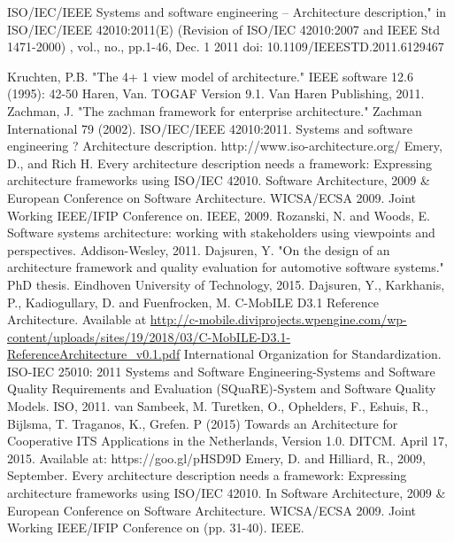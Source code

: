 \documentclass[letterpaper, 10 pt, conference]{ieeeconf}  %
\begin{document}
\begin{thebibliography}{99}


 ISO/IEC/IEEE Systems and software engineering -- Architecture description," in ISO/IEC/IEEE 42010:2011(E) (Revision of ISO/IEC 42010:2007 and IEEE Std 1471-2000) , vol., no., pp.1-46, Dec. 1 2011 doi: 10.1109/IEEESTD.2011.6129467

Kruchten, P.B. "The 4+ 1 view model of architecture." IEEE software 12.6 (1995): 42-50
Haren, Van. TOGAF Version 9.1. Van Haren Publishing, 2011.
Zachman, J. "The zachman framework for enterprise architecture." Zachman International 79 (2002).
 ISO/IEC/IEEE 42010:2011. Systems and software engineering ? Architecture description. http://www.iso-architecture.org/
Emery, D., and Rich H. Every architecture description needs a framework: Expressing architecture frameworks using ISO/IEC 42010. Software Architecture, 2009 \& European Conference on Software Architecture. WICSA/ECSA 2009. Joint Working IEEE/IFIP Conference on. IEEE, 2009.
Rozanski, N. and Woods, E. Software systems architecture: working with stakeholders using viewpoints and perspectives. Addison-Wesley, 2011.
Dajsuren, Y. "On the design of an architecture framework and quality evaluation for automotive software systems." PhD thesis. Eindhoven University of Technology, 2015.
 Dajsuren, Y., Karkhanis, P., Kadiogullary, D. and Fuenfrocken, M. C-MobILE D3.1 Reference Architecture. Available at \url{http://c-mobile.diviprojects.wpengine.com/wp-content/uploads/sites/19/2018/03/C-MobILE-D3.1-ReferenceArchitecture_v0.1.pdf}
International Organization for Standardization. ISO-IEC 25010: 2011 Systems and Software Engineering-Systems and Software Quality Requirements and Evaluation (SQuaRE)-System and Software Quality Models. ISO, 2011.
 van Sambeek, M. Turetken, O., Ophelders, F., Eshuis, R., Bijlsma, T. Traganos, K., Grefen. P (2015) Towards an Architecture for Cooperative ITS Applications in the Netherlands, Version 1.0. DITCM. April 17, 2015. Available at: https://goo.gl/pHSD9D
Emery, D. and Hilliard, R., 2009, September. Every architecture description needs a framework: Expressing architecture frameworks using ISO/IEC 42010. In Software Architecture, 2009 \& European Conference on Software Architecture. WICSA/ECSA 2009. Joint Working IEEE/IFIP Conference on (pp. 31-40). IEEE.
\end{thebibliography}
\end{document}
